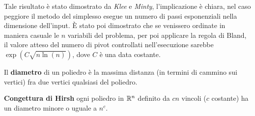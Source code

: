 \documentclass[10pt, letterpaper]{report}
\begin{document}
Tale risultato è stato dimostrato da  \textit{Klee} e \textit{Minty}, l'implicazione è chiara, nel caso peggiore il metodo del simplesso esegue un numero di passi esponenziali nella dimensione dell'input. È stato poi dimostrato che se venissero ordinate in maniera casuale le $n$ variabili del problema, per poi applicare la regola di Bland, il valore atteso del numero di pivot controllati nell'esecuzione sarebbe $\exp(C\sqrt{n\ln{(n)}})$, dove $C$ è una data costante.
\begin{definizione}
    Il \textbf{diametro} di un poliedro è la massima distanza (in termini di cammino sui vertici) fra due vertici qualsiasi del poliedro.
\end{definizione}
\textbf{Congettura di Hirsh} ogni poliedro in ${\mathbb R}^n$ definito da $cn$ vincoli ($c$ costante) ha un diametro minore o uguale a $n^c$.
\end{document}
